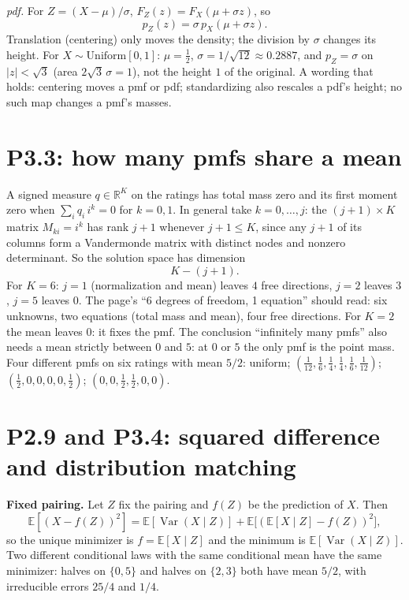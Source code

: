 \documentclass[11pt]{article}
\newcommand{\E}{\mathbb{E}}
\newcommand{\Var}{\operatorname{Var}}
\begin{document}
\emph{pdf.} For $Z=(X-\mu)/\sigma$, $F_Z(z)=F_X(\mu+\sigma z)$, so
\[
\boxed{p_Z(z)=\sigma\,p_X(\mu+\sigma z)} .
\]
Translation (centering) only moves the density; the division by $\sigma$ changes its height. For $X\sim\mathrm{Uniform}[0,1]$: $\mu=\tfrac12$, $\sigma=1/\sqrt{12}\approx0.2887$, and $p_Z=\sigma$ on $|z|<\sqrt3$ (area $2\sqrt3\,\sigma=1$), not the height $1$ of the original. A wording that holds: centering moves a pmf or pdf; standardizing also rescales a pdf's height; no such map changes a pmf's masses.

\section{P3.3: how many pmfs share a mean}

A signed measure $q\in\mathbb R^K$ on the ratings has total mass zero and its first moment zero when $\sum_i q_i\,i^k=0$ for $k=0,1$. In general take $k=0,\dots,j$: the $(j+1)\times K$ matrix $M_{ki}=i^k$ has rank $j+1$ whenever $j+1\le K$, since any $j+1$ of its columns form a Vandermonde matrix with distinct nodes and nonzero determinant. So the solution space has dimension
\[
\boxed{K-(j+1)} .
\]
For $K=6$: $j=1$ (normalization and mean) leaves $4$ free directions, $j=2$ leaves $3$, $j=5$ leaves $0$. The page's ``6 degrees of freedom, 1 equation'' should read: six unknowns, two equations (total mass and mean), four free directions. For $K=2$ the mean leaves $0$: it fixes the pmf. The conclusion ``infinitely many pmfs'' also needs a mean strictly between $0$ and $5$: at $0$ or $5$ the only pmf is the point mass. Four different pmfs on six ratings with mean $5/2$: uniform; $(\tfrac1{12},\tfrac16,\tfrac14,\tfrac14,\tfrac16,\tfrac1{12})$; $(\tfrac12,0,0,0,0,\tfrac12)$; $(0,0,\tfrac12,\tfrac12,0,0)$.

\section{P2.9 and P3.4: squared difference and distribution matching}

\textbf{Fixed pairing.} Let $Z$ fix the pairing and $f(Z)$ be the prediction of $X$. Then
\[
\E[(X-f(Z))^2]=\E[\Var(X\mid Z)]+\E\big[(\E[X\mid Z]-f(Z))^2\big],
\]
so the unique minimizer is $f=\E[X\mid Z]$ and the minimum is $\E[\Var(X\mid Z)]$. Two different conditional laws with the same conditional mean have the same minimizer: halves on $\{0,5\}$ and halves on $\{2,3\}$ both have mean $5/2$, with irreducible errors $25/4$ and $1/4$.
\end{document}
